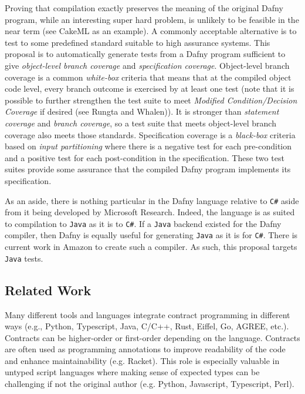 \documentclass[11pt,onecolumn,notitlepage]{article}
\begin{document}
Proving that compilation exactly preserves the meaning of the original Dafny program, while an interesting super hard problem, is unlikely to be feasible in the near term (see CakeML as an example). A commonly acceptable alternative is to test to some predefined standard suitable to high assurance systems. This proposal is to automatically generate tests from a Dafny program sufficient to give \emph{object-level branch coverage} and \emph{specification coverage}. Object-level branch coverage is a common \emph{white-box} criteria that means that at the compiled object code level, every branch outcome is exercised by at least one test (note that it is possible to further strengthen the test suite to meet \emph{Modified Condition/Decision Coverage} if desired (see Rungta and Whalen)). It is stronger than \emph{statement coverage} and \emph{branch coverage}, so a test suite that meets object-level branch coverage also meets those standards. Specification coverage is a \emph{black-box} criteria based on \emph{input partitioning} where there is a negative test for each pre-condition and a positive test for each post-condition in the specification. These two test suites provide some assurance that the compiled Dafny program implements its specification.

As an aside, there is nothing particular in the Dafny language relative to \texttt{C\#} aside from it being developed by Microsoft Research. Indeed, the language is as suited to compilation to \texttt{Java} as it is to \texttt{C\#}. If a \texttt{Java} backend existed for the Dafny compiler, then Dafny is equally useful for generating \texttt{Java} as it is for \texttt{C\#}. There is current work in Amazon to create such a compiler. As such, this proposal targets \texttt{Java} tests.

\subsection*{Related Work}

Many different tools and languages integrate contract programming in different ways (e.g., Python, Typescript, Java, C/C++, Rust, Eiffel, Go, AGREE, etc.). Contracts can be higher-order or first-order depending on the language. Contracts are often used as programming annotations to improve readability of the code and enhance maintainability (e.g. Racket). This role is especially valuable in untyped script languages where making sense of expected types can be challenging if not the original author (e.g. Python, Javascript, Typescript, Perl). 
\end{document}
